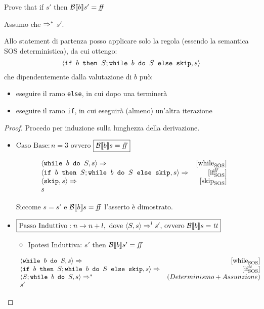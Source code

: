          {
           Prove that if  \Rar{*} $s'$ then $\B{b}' = \semfalse$
         }
         {
           Assumo che  $\Rar{*}$ $s'$.

            Allo statement di partenza posso applicare solo la regola \whileSOS 
            (essendo la semantica SOS deterministica), da cui ottengo:  
           $$
            \confSs{\ifABC{b}{S; \wbS{b}{S}}{\skipForFriends}}{s} 
           $$
            che dipendentemente dalla valutazione di $b$ può: 
            \begin{itemize}
               \item eseguire il ramo \texttt{else}, in cui dopo una 
               \skipForFriends{} terminerà 
               \item eseguire il ramo \texttt{if}, in cui eseguirà (almeno) 
               un'altra iterazione
            \end{itemize}
           \begin{proof}
                        Procedo per induzione sulla lunghezza della derivazione.

           \begin{itemize}
             \item $\boxed{\text{Caso Base}: n = 3}$ ovvero 
           $\boxed{\B{b} = \semfalse}$ 

          $$
          \begin{array}{lrr}
    \confSs{\wbS{b}{S}}{s} \Rar{} & \whileSOS & \\
    \confSs{\ifABC{b}{S; \wbS{b}{S}}{\skipForFriends}}{s} \Rar{} & \ifffSOS & \\
    \confSs{\skipForFriends}{s} \Rar{} & \skipSOS & \\
    s & & \\
          \end{array}
          $$

           Siccome $s = s'$ e $\B{b} = \semfalse$ l'asserto è dimostrato.

           \item $\boxed{\text{Passo Induttivo}: n \rightarrow n + l,
             \text{ dove } \confSs{S}{s} \Rar{l} s' \text{, ovvero } \B{b} = \semtrue}$
             \begin{itemize}
               \item Ipotesi Induttiva:   $s'$ then $\B{b}' = \semfalse$
             \end{itemize}
          $$
          \begin{array}{lrr}
    \confSs{\wbS{b}{S}}{s} \Rar{} & \whileSOS & \\
    \confSs{\ifABC{b}{S; \wbS{b}{S}}{\skipForFriends}}{s} \Rar{} & \ifttSOS & \\
    \confSs{S; \wbS{b}{S}}{s} \Rar{*} & (Determinismo + Assunzione) & \\
    s' & & \\
          \end{array}
          $$


\end{itemize}
\end{proof}}
